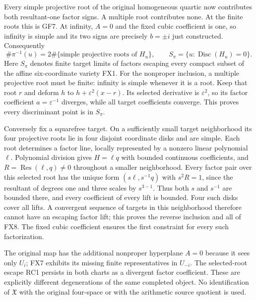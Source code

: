 \documentclass[11pt]{article}
\begin{document}
Every simple projective root of the original homogeneous quartic
now contributes both resultant-one factor signs. A multiple root
contributes none. At the finite roots this is GF7. At infinity,
$A=0$ and the fixed cubic coefficient is one, so infinity is
simple and its two signs are precisely $b=\pm i$ just constructed.
Consequently
\[
 \#\pi^{-1}(u)=2\#\{\text{simple projective roots of }H_u\},
 \qquad S_\pi=\{u:\operatorname{Disc}(H_u)=0\}.
 \tag{FX8}
\]
Here $S_\pi$ denotes finite target limits of factors escaping every
compact subset of the affine six-coordinate variety FX1.
For the nonproper inclusion, a multiple projective root must be
finite: infinity is simple whenever it is a root. Keep that root
$r$ and deform $h$ to $h+\varepsilon^2(x-r)$. Its selected
derivative is $\varepsilon^2$, so its factor coefficient
$a=\varepsilon^{-1}$ diverges, while all target coefficients
converge. This proves every discriminant point is in $S_\pi$.

Conversely fix a squarefree target. On a sufficiently small target
neighborhood its four projective roots lie in four disjoint coordinate
disks and are simple. Each root determines a factor line, locally
represented by a nonzero linear polynomial $\ell$. Polynomial
division gives $H=\ell q$ with bounded continuous coefficients,
and $R=\operatorname{Res}(\ell,q)\ne0$ throughout a smaller
neighborhood. Every factor pair over this selected root has the
unique form $(s\ell,s^{-1}q)$ with $s^2R=1$, since the
resultant of degrees one and three scales by $s^{3-1}$.
Thus both $s$ and $s^{-1}$ are bounded there, and every coefficient
of every lift is bounded. Four such disks cover all lifts. A
convergent sequence of targets in this neighborhood therefore
cannot have an escaping factor lift; this proves the reverse
inclusion and all of FX8. The fixed cubic coefficient ensures
the first constraint for every such factorization.

The original map has the additional nonproper hyperplane $A=0$
because it sees only $U_i$; FX7 exhibits its missing finite
representatives in $U_{-i}$. The selected-root escape RC1 persists
in both charts as a divergent factor coefficient. These are
explicitly different degenerations of the same completed object.
No identification of $\mathfrak X$ with the original four-space
or with the arithmetic source quotient is used.

\end{document}

